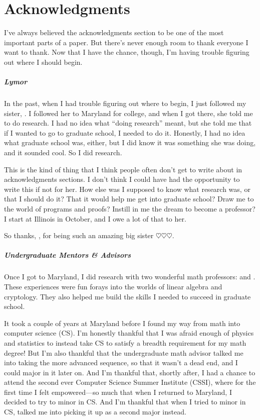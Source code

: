 
\cleardoublepage
{}
\chapter*{Acknowledgments}
I've always believed the acknowledgments section to be one of the most important parts of a paper.
But there's never enough room to thank everyone I want to thank.
Now that I have the chance, though, I'm having trouble figuring out where I should begin.

\paragraph{Lymor}
In the past, when I had trouble figuring out where to begin, I just followed my sister, .
I followed her to Maryland for college, and when I got there, she told me to do research.
I had no idea what ``doing research'' meant, but she told me that if I wanted to go to graduate school, I needed to do it.
Honestly, I had no idea what graduate school was, either, but I did know it was something she was doing, and it sounded cool.
So I did research.

This is the kind of thing that I think people often don't get to write about in acknowledgments sections.
I don't think I could have had the opportunity to write this if not for her.
How else was I supposed to know what research was, or that I should do it?
That it would help me get into graduate school?
Draw me to the world of programs and proofs?
Instill in me the dream to become a professor?
I start at Illinois in October, and I owe a lot of that to her.

So thanks, , for being such an amazing big sister $\heartsuit \heartsuit \heartsuit$.

\paragraph{Undergraduate Mentors \& Advisors}
Once I got to Maryland, I did research with two wonderful math professors:
 and .
These experiences were fun forays into the worlds of linear algebra and cryptology.
They also helped me build the skills I needed to succeed in graduate school.

It took a couple of years at Maryland before I found my way from math into computer science (CS).
I'm honestly thankful that I was afraid enough of physics and statistics to instead take CS to satisfy a breadth requirement for my math degree!
But I'm also thankful that the undergraduate math advisor  talked me into taking the more advanced sequence, so that it wasn't a dead end,
and I could major in it later on. And I'm thankful that, shortly after, I had a chance to attend the second ever
 Computer Science Summer Institute (CSSI), where for the first time I felt empowered---so much that when I returned to Maryland,
I decided to try to minor in CS. And I'm thankful that when I tried to minor in CS,
 talked me into picking it up as a second major instead.

